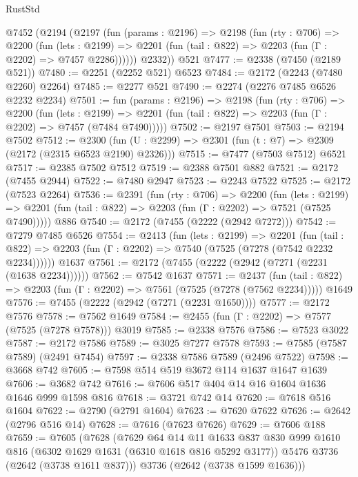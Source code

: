 \begin{lexlean}{RustStd}
\begin{coremodule}
    @7452
      (@2194
        (@2197
          (fun (params : @2196) =>
          @2198
            (fun (rty : @706) =>
            @2200
              (fun (lets : @2199) =>
              @2201 (fun (tail : @822) => @2203 (fun (Γ : @2202) => @7457 @2286))))))
        @2332))
    @521
@7477 := @2338 (@7450 (@2189 @521))
@7480 := @2251 (@2252 @521) @6523
@7484 := @2172 (@2243 (@7480 @2260) @2264)
@7485 := @2277 @521
@7490 := @2274 (@2276 @7485 @6526 @2232 @2234)
@7501 := fun (params : @2196) =>
  @2198
    (fun (rty : @706) =>
    @2200
      (fun (lets : @2199) =>
      @2201 (fun (tail : @822) => @2203 (fun (Γ : @2202) => @7457 (@7484 @7490)))))
@7502 := @2197 @7501
@7503 := @2194 @7502
@7512 := @2300 (fun (U : @2299) => @2301 (fun (t : @7) => @2309 (@2172 (@2315 @6523 @2190) @2326)))
@7515 := @7477 (@7503 @7512) @6521
@7517 := @2385 @7502 @7512
@7519 := @2388 @7501 @882
@7521 := @2172 (@7455 @2944)
@7522 := @7480 @2947
@7523 := @2243 @7522
@7525 := @2172 (@7523 @2264)
@7536 := @2391
    (fun (rty : @706) =>
    @2200
      (fun (lets : @2199) =>
      @2201 (fun (tail : @822) => @2203 (fun (Γ : @2202) => @7521 (@7525 @7490)))))
    @886
@7540 := @2172 (@7455 (@2222 (@2942 @7272)))
@7542 := @7279 @7485 @6526
@7554 := @2413
    (fun (lets : @2199) =>
    @2201
      (fun (tail : @822) => @2203 (fun (Γ : @2202) => @7540 (@7525 (@7278 (@7542 @2232 @2234))))))
    @1637
@7561 := @2172 (@7455 (@2222 (@2942 (@7271 (@2231 (@1638 @2234))))))
@7562 := @7542 @1637
@7571 := @2437
    (fun (tail : @822) => @2203 (fun (Γ : @2202) => @7561 (@7525 (@7278 (@7562 @2234)))))
    @1649
@7576 := @7455 (@2222 (@2942 (@7271 (@2231 @1650))))
@7577 := @2172 @7576
@7578 := @7562 @1649
@7584 := @2455 (fun (Γ : @2202) => @7577 (@7525 (@7278 @7578))) @3019
@7585 := @2338 @7576
@7586 := @7523 @3022
@7587 := @2172 @7586
@7589 := @3025 @7277 @7578
@7593 := @7585 (@7587 @7589) (@2491 @7454)
@7597 := @2338 @7586 @7589 (@2496 @7522)
@7598 := @3668 @742
@7605 := @7598 @514 @519 @3672 @114 @1637 @1647 @1639
@7606 := @3682 @742
@7616 := @7606 @517 @404 @14 @16 @1604 @1636 @1646 @999 @1598 @816
@7618 := @3721 @742 @14
@7620 := @7618 @516 @1604
@7622 := @2790 (@2791 @1604)
@7623 := @7620 @7622
@7626 := @2642 (@2796 @516 @14)
@7628 := @7616 (@7623 @7626)
@7629 := @7606 @188
@7659 := @7605
    (@7628
      (@7629
        @64
        @14
        @11
        @1633
        @837
        @830
        @999
        @1610
        @816
        (@6302 @1629 @1631 (@6310 @1618 @816 @5292 @3177))
        @5476
        @3736
        (@2642 (@3738 @1611 @837)))
      @3736
      (@2642 (@3738 @1599 @1636)))

\end{coremodule}
\end{lexlean}
